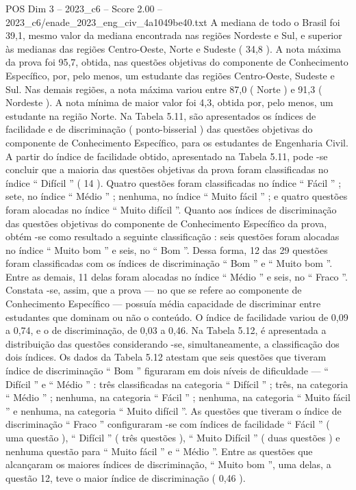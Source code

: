 \begin{textsample}{POS Dim 3 – 2023\_c6 – Score 2.00 – 2023\_c6/enade\_2023\_eng\_civ\_4a1049be40.txt}
A mediana de todo o Brasil foi 39,1, mesmo valor da mediana encontrada nas regiões Nordeste e Sul, e superior às medianas das regiões Centro-Oeste, Norte e Sudeste ( 34,8 ).
A nota máxima da prova foi 95,7, obtida, nas questões objetivas do componente de Conhecimento Específico, por, pelo menos, um estudante das regiões Centro-Oeste, Sudeste e Sul.
Nas demais regiões, a nota máxima variou entre 87,0 ( Norte ) e 91,3 ( Nordeste ).
A nota mínima de maior valor foi 4,3, obtida por, pelo menos, um estudante na região Norte.
Na Tabela 5.11, são apresentados os índices de facilidade e de discriminação ( ponto-bisserial ) das questões objetivas do componente de Conhecimento Específico, para os estudantes de Engenharia Civil.
A partir do índice de facilidade obtido, apresentado na Tabela 5.11, pode -se concluir que a maioria das questões objetivas da prova foram classificadas no índice “ Difícil ” ( 14 ).
Quatro questões foram classificadas no índice “ Fácil ” ; sete, no índice “ Médio ” ; nenhuma, no índice “ Muito fácil ” ; e quatro questões foram alocadas no índice “ Muito difícil ”.
Quanto aos índices de discriminação das questões objetivas do componente de Conhecimento Específico da prova, obtém -se como resultado a seguinte classificação : seis questões foram alocadas no índice “ Muito bom ” e seis, no “ Bom ”.
Dessa forma, 12 das 29 questões foram classificadas com os índices de discriminação “ Bom ” e “ Muito bom ”.
Entre as demais, 11 delas foram alocadas no índice “ Médio ” e seis, no “ Fraco ”.
Constata -se, assim, que a prova — no que se refere ao componente de Conhecimento Específico — possuía média capacidade de discriminar entre estudantes que dominam ou não o conteúdo.
O índice de facilidade variou de 0,09 a 0,74, e o de discriminação, de 0,03 a 0,46.
Na Tabela 5.12, é apresentada a distribuição das questões considerando -se, simultaneamente, a classificação dos dois índices.
Os dados da Tabela 5.12 atestam que seis questões que tiveram índice de discriminação “ Bom ” figuraram em dois níveis de dificuldade — “ Difícil ” e “ Médio ” : três classificadas na categoria “ Difícil ” ; três, na categoria “ Médio ” ; nenhuma, na categoria “ Fácil ” ; nenhuma, na categoria “ Muito fácil ” e nenhuma, na categoria “ Muito difícil ”.
As questões que tiveram o índice de discriminação “ Fraco ” configuraram -se com índices de facilidade “ Fácil ” ( uma questão ), “ Difícil ” ( três questões ), “ Muito Difícil ” ( duas questões ) e nenhuma questão para “ Muito fácil ” e “ Médio ”.
Entre as questões que alcançaram os maiores índices de discriminação, “ Muito bom ”, uma delas, a questão 12, teve o maior índice de discriminação ( 0,46 ).

\end{textsample}
